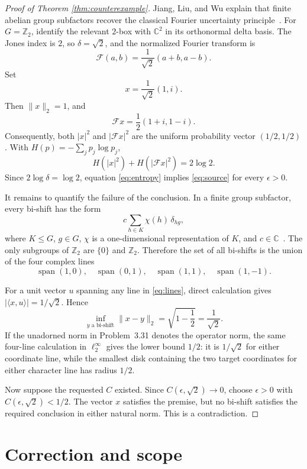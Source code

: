 \documentclass[11pt]{article}
\newcommand{\F}{\mathcal F}
\newcommand{\C}{\mathbb C}
\begin{document}
\begin{proof}[Proof of Theorem \ref{thm:counterexample}]
Jiang, Liu, and Wu explain that finite abelian group subfactors recover the
classical Fourier uncertainty principle~\cite[Sections 2 and 8]{JLW}.  For
$G=\mathbb Z_2$, identify the relevant $2$-box with $\C^2$ in its orthonormal
delta basis.  The Jones index is $2$, so $\delta=\sqrt2$, and the normalized
Fourier transform is
\[
 \F(a,b)=\frac1{\sqrt2}(a+b,a-b).
\]
Set
\[
 x=\frac1{\sqrt2}(1,i).
\]
Then $\|x\|_2=1$, and
\[
 \F x=\frac12(1+i,1-i).
\]
Consequently, both $|x|^2$ and $|\F x|^2$ are the uniform probability vector
$(1/2,1/2)$.  With $H(p)=-\sum_jp_j\log p_j$,
\begin{equation}\label{eq:entropy}
 H(|x|^2)+H(|\F x|^2)=2\log2.
\end{equation}
Since $2\log\delta=\log2$, equation \eqref{eq:entropy} implies
\eqref{eq:source} for every $\epsilon>0$.

It remains to quantify the failure of the conclusion.  In a finite group
subfactor, every bi-shift has the form
\[
 c\sum_{h\in K}\chi(h)\,\delta_{hg},
\]
where $K\le G$, $g\in G$, $\chi$ is a one-dimensional representation of
$K$, and $c\in\C$~\cite[Proposition 8.1]{JLW}.  The only subgroups of
$\mathbb Z_2$ are $\{0\}$ and $\mathbb Z_2$.  Therefore the set of all
bi-shifts is the union of the four complex lines
\begin{equation}\label{eq:lines}
 \operatorname{span}(1,0),\quad
 \operatorname{span}(0,1),\quad
 \operatorname{span}(1,1),\quad
 \operatorname{span}(1,-1).
\end{equation}

\newpage
For a unit vector $u$ spanning any line in \eqref{eq:lines}, direct
calculation gives $|\langle x,u\rangle|=1/\sqrt2$.  Hence
\[
 \inf_{y\text{ a bi-shift}}\|x-y\|_2
 =\sqrt{1-\frac12}=\frac1{\sqrt2}.
\]
If the unadorned norm in Problem~3.31 denotes the operator norm, the same
four-line calculation in $\ell^\infty_2$ gives the lower bound $1/2$: it is
$1/\sqrt2$ for either coordinate line, while the smallest disk containing
the two target coordinates for either character line has radius $1/2$.

Now suppose the requested $C$ existed.  Since
$C(\epsilon,\sqrt2)\to0$, choose $\epsilon>0$ with
$C(\epsilon,\sqrt2)<1/2$.  The vector $x$ satisfies the premise, but no
bi-shift satisfies the required conclusion in either natural norm.  This is
a contradiction.
\end{proof}

\section{Correction and scope}
\end{document}
